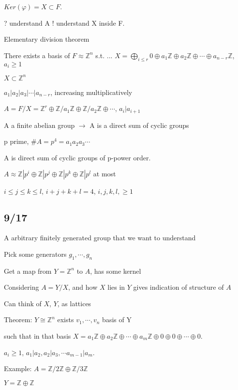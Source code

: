 \documentclass[12pt]{article}
\begin{document}
$Ker(\varphi) = X \subset F$.

? understand A ! understand X inside F.

\noindent
Elementary division theorem

There exists a basis of $F \approx \mathds{Z}^n$ s.t. ... $X = \bigoplus_{i \leq r}0 \oplus a_1\mathds{Z} \oplus a_2\mathds{Z} \oplus \cdots \oplus a_{n - r}\mathds{Z}$, $a_i \geq 1$

$X \subset \mathds{Z}^n$

$a_1 | a_2 | a_3 | \cdots | a_{n - r}$, increasing multiplicatively

$A = F/X = \mathds{Z}^r \oplus \mathds{Z}/a_1\mathds{Z} \oplus \mathds{Z}/a_2\mathds{Z} \oplus \cdots$, $a_i | a_{i + 1}$

A a finite abelian group $\to$ A is a direct sum of cyclic groups

\noindent
p prime, $\#A = p^4 = a_1a_2a_3\cdots$

A is direct sum of cyclic groups of p-power order.

$A \approx \mathds{Z}|p^i \oplus \mathds{Z}|p^j \oplus \mathds{Z}|p^k \oplus \mathds{Z}|p^l$ at most

$i \leq j \leq k \leq l$, $i + j + k + l = 4$, $i, j, k, l, \geq 1$

\subsection{9/17}

\noindent
A arbitrary finitely generated group that we want to understand

Pick some generators $g_1, \cdots, g_n$

Get a map from $Y = \mathds{Z}^n$ to $A$, has some kernel

Considering $A = Y/X$, and how $X$ lies in $Y$ gives indication of structure of $A$

Can think of $X$, $Y$, as lattices

\noindent
Theorem: $Y \cong \mathds{Z}^n$ exists $v_1, \cdots, v_n$ basis of Y

such that in that basis $X = a_1\mathds{Z} \oplus a_2\mathds{Z} \oplus \cdots \oplus a_m\mathds{Z} \oplus 0 \oplus 0 \oplus \cdots \oplus 0.$

$a_i \geq 1$, $a_1 | a_2, a_2 | a_3, \cdots a_{m - 1}|a_m$.

\noindent
Example: $A = \mathds{Z}/2\mathds{Z} \oplus \mathds{Z}/3\mathds{Z}$

$Y = \mathds{Z} \oplus \mathds{Z}$
\end{document}
